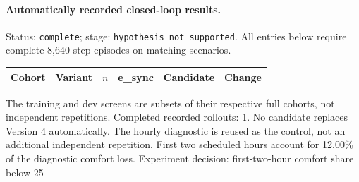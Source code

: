 \paragraph{Automatically recorded closed-loop results.}
Status: \texttt{complete}; stage: \texttt{hypothesis\_not\_supported}.
All entries below require complete 8,640-step episodes on matching scenarios.
\begin{center}\small
\begin{tabular}{llrrrr}\toprule
Cohort & Variant & $n$ & e\_sync & Candidate & Change \\\midrule
\bottomrule\end{tabular}\end{center}
The training and dev screens are subsets of their respective full cohorts, not independent repetitions.
Completed recorded rollouts: 1. No candidate replaces Version 4 automatically.
The hourly diagnostic is reused as the control, not an additional independent repetition.
First two scheduled hours account for 12.00\% of the diagnostic comfort loss.
Experiment decision: first-two-hour comfort share below 25%
